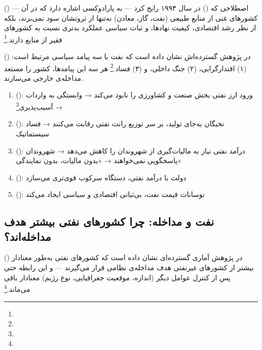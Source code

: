  () — اصطلاحی که  () در سال ۱۹۹۳ رایج کرد — به پارادوکسی اشاره دارد که در آن کشورهای غنی از منابع طبیعی (نفت، گاز، معادن) نه‌تنها از ثروتشان سود نمی‌برند، بلکه از نظر رشد اقتصادی، کیفیت نهادها، و ثبات سیاسی عملکرد بدتری نسبت به کشورهای فقیر از منابع دارند.\footnote{}

 () در پژوهش گسترده‌اش نشان داده است که نفت با سه پیامد سیاسی مرتبط است: (۱) اقتدارگرایی، (۲) جنگ داخلی، و (۳) فساد.\footnote{} هر سه این پیامدها، کشور را مستعد مداخله‌ی خارجی می‌سازند.

\begin{tcolorbox}[defbox, title={مکانیزم‌های نفرین منابع}]
\begin{enumerate}
\item {} (): ورود ارز نفتی بخش صنعت و کشاورزی را نابود می‌کند → وابستگی به واردات → آسیب‌پذیری\footnote{}
\item {} (): نخبگان به‌جای تولید، بر سر توزیع رانت نفتی رقابت می‌کنند → فساد سیستماتیک
\item {} (): درآمد نفتی نیاز به مالیات‌گیری از شهروندان را کاهش می‌دهد → شهروندان پاسخگویی نمی‌خواهند → «بدون مالیات، بدون نمایندگی»
\item {} (): دولت با درآمد نفتی، دستگاه سرکوب قوی‌تری می‌سازد
\item {} (): نوسانات قیمت نفت، بی‌ثباتی اقتصادی و سیاسی ایجاد می‌کند
\end{enumerate}
\end{tcolorbox}

\subsection{نفت و مداخله: چرا کشورهای نفتی بیشتر هدف مداخله‌اند؟}
\label{subsec:ch12-oil-intervention}

 () در پژوهش آماری گسترده‌ای نشان داده است که کشورهای نفتی به‌طور معنادار بیشتر از کشورهای غیرنفتی هدف مداخله‌ی نظامی قرار می‌گیرند — و این رابطه حتی پس از کنترل عوامل دیگر (اندازه، موقعیت جغرافیایی، نوع رژیم) معنادار باقی می‌ماند.\footnote{}

